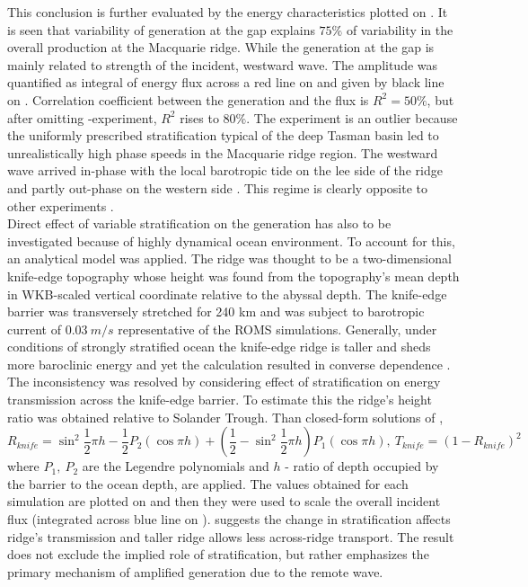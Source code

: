 \documentclass[12pt]{article}
\begin{document}
This conclusion is further evaluated by the energy characteristics plotted on 
. It is seen that variability of generation at the gap explains  
$75\%$ of variability in the overall production at the Macquarie ridge. While the generation at the 
gap is mainly related to strength of the incident, westward wave. The amplitude was 
quantified as integral of energy flux across a red line on  and 
given by black line on . Correlation coefficient between the 
generation and the flux is $R^2 = 50\%$, but after omitting -experiment, $R^2$ rises 
to $80\%$. The  experiment is an outlier because the uniformly prescribed 
stratification typical of the deep Tasman basin led to unrealistically high phase speeds in the 
Macquarie ridge region. The westward wave arrived in-phase with the local barotropic tide on the 
lee side of the ridge and partly out-phase on the western side . This regime 
is clearly opposite to other experiments .\\

Direct effect of variable stratification on the generation has also to be investigated because of 
highly dynamical ocean environment. To account for this, an analytical model 
\citep{st2003generation} was applied. The ridge was thought to be a two-dimensional knife-edge 
topography whose height was found from the topography's mean depth in WKB-scaled vertical 
coordinate \citep{althaus2003internal} relative to the abyssal depth. The knife-edge barrier was  
transversely stretched for 240 km and was subject to barotropic current of $0.03~m/s$ 
representative of the ROMS simulations. Generally, under conditions of strongly stratified ocean 
the knife-edge ridge is taller and sheds more baroclinic energy and yet the calculation resulted in 
converse dependence . The inconsistency was resolved by 
considering effect of stratification on energy transmission across the knife-edge barrier. To 
estimate this the ridge's height ratio was obtained relative to Solander Trough. Than closed-form 
solutions of \citep{larsen1969internal},
\begin{equation}
\label{C3.eq:ke_transm}
R_{knife} = \sin^2 \frac{1}{2} \pi h - \frac{1}{2} P_2( \cos \pi h ) + (\frac{1}{2} - \sin^2 
\frac{1}{2} \pi h) P_1( \cos \pi h ),~
T_{knife} = (1 - R_{knife})^2
\end{equation}
where $P_1,~P_2$ are the Legendre polynomials and $h$ - ratio of depth occupied by the barrier to 
the ocean depth, are applied. The values obtained for each simulation are plotted on 
 and then they were used to scale the overall 
incident flux (integrated across blue line on ). 
 suggests the change in stratification affects ridge's transmission 
and taller ridge allows less across-ridge transport. The result does not exclude the implied role 
of stratification, but rather emphasizes the primary mechanism of amplified generation due to the 
remote wave.\\
\end{document}
